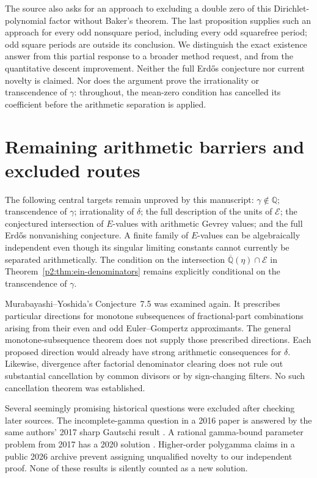 \documentclass[11pt,a4paper]{article}
\theoremstyle{definition}
\theoremstyle{remark}
\numberwithin{equation}{section}
\begin{document}
The source also asks for an approach to excluding a double zero
of this Dirichlet-polynomial factor without Baker's theorem.  The
last proposition supplies such an approach for every odd nonsquare
period, including every odd squarefree period; odd square periods
are outside its conclusion.  We distinguish the exact existence
answer from this partial response to a broader method request,
and from the quantitative descent improvement.  Neither the
full Erd\H{o}s conjecture nor current novelty is claimed.  Nor does the argument
prove the irrationality or transcendence of $\gamma$: throughout,
the mean-zero condition has cancelled its coefficient before the
arithmetic separation is applied.


\section{Remaining arithmetic barriers and excluded routes}
\label{p2:sec:round2-remaining}

The following central targets remain unproved by this manuscript:
$\gamma\notin\mathbb Q$; transcendence of $\gamma$; irrationality of
$\delta$; the full description of the units of $\mathcal E$;
the conjectured intersection of $E$-values with arithmetic Gevrey values;
and the full Erd\H{o}s nonvanishing conjecture. A finite family of
$E$-values can be algebraically independent even though its singular
limiting constants cannot currently be separated arithmetically.
The condition on the intersection
$\overline{\mathbb Q}(\eta)\cap\mathcal E$ in
Theorem~\ref{p2:thm:ein-denominators} remains explicitly conditional on
the transcendence of $\gamma$.

Murabayashi--Yoshida's Conjecture~7.5 \cite{p2:MY2024} was examined again.
It prescribes particular directions for monotone subsequences of
fractional-part combinations arising from their even and odd
Euler--Gompertz approximants. The general monotone-subsequence theorem
does not supply those prescribed directions. Each proposed direction
would already have strong arithmetic consequences for $\delta$.
Likewise, divergence after factorial denominator clearing does not
rule out substantial cancellation by common divisors or by
sign-changing filters. No such cancellation theorem was established.

Several seemingly promising historical questions were excluded after
checking later sources. The incomplete-gamma question in a 2016 paper
is answered by the same authors' 2017 sharp Gautschi result
\cite{p2:Yang2017Gautschi}. A rational gamma-bound parameter problem from
2017 has a 2020 solution \cite{p2:Gamma2020}. Higher-order polygamma
claims in a public 2026 archive \cite{p2:pudim2026} prevent assigning
unqualified novelty to our independent proof. None of these results
is silently counted as a new solution.
\end{document}
